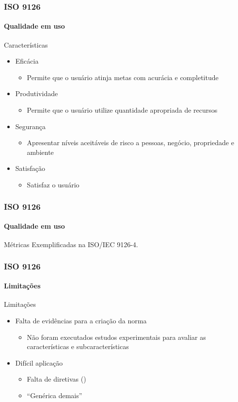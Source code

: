 \begin{frame}
	\frametitle{ISO 9126}
	\framesubtitle{Qualidade em uso}
	
	\begin{block:fact}{Características}
		\begin{itemize}
			\item Eficácia
			\begin{itemize}
				\item Permite que o usuário atinja metas com acurácia e completitude
			\end{itemize}
			
			\item Produtividade
			\begin{itemize}
				\item Permite que o usuário utilize quantidade apropriada de recursos
			\end{itemize}

			\item Segurança
			\begin{itemize}
				\item Apresentar níveis aceitáveis de risco a pessoas, negócio, propriedade e ambiente
			\end{itemize}

			\item Satisfação
			\begin{itemize}
				\item Satisfaz o usuário
			\end{itemize}
		\end{itemize}
	\end{block:fact}
\end{frame}

\begin{frame}
	\frametitle{ISO 9126}
	\framesubtitle{Qualidade em uso}
	
	\begin{block:fact}{Métricas}
		Exemplificadas na ISO/IEC 9126-4.
	\end{block:fact}
\end{frame}


\begin{frame}
	\frametitle{ISO 9126}
	\framesubtitle{Limitações}
	
	\begin{block:fact}{Limitações}
		\begin{itemize}
			\item Falta de evidências para a criação da norma
			\begin{itemize}
				\item Não foram executados estudos experimentais para avaliar as
				características e subcaracterísticas
			\end{itemize}
			
			\item Difícil aplicação
			\begin{itemize}
				\item Falta de diretivas ()
				\item ``Genérica demais''
			\end{itemize}
		\end{itemize}
	\end{block:fact}
\end{frame}

